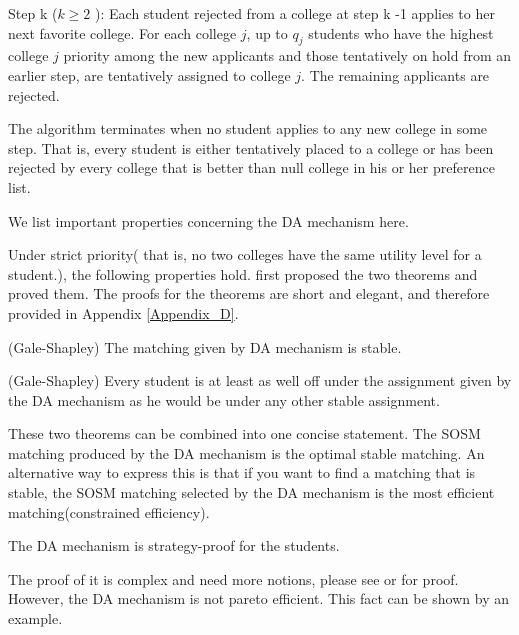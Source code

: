 Step k ($ k \geq 2$ ): Each student rejected from a college at step k -1 applies to her next favorite college.
For each college $j$, up to $q_j$  students who have the highest college
$j$ priority among the new applicants and those tentatively on hold from an earlier step, are
tentatively assigned to college $j$. 
The remaining applicants are rejected.

The algorithm terminates when no student applies to any new college in
some step. That is, every  student is either tentatively placed to a college
or has been rejected by every college that is better than null college
in his or her preference list. 

We list important properties concerning the DA mechanism here.

Under strict priority( that is, no two colleges have  the same utility
level for a student.), the following properties
hold. \parencite{Gale1962} first proposed the two theorems and proved
them. The proofs for the theorems are short and elegant, and therefore
provided in Appendix \ref{Appendix_D}.

\begin{thm*}(Gale-Shapley)
The matching given by DA mechanism is stable.
\end{thm*}

\begin{thm*}(Gale-Shapley)
Every student is at least as well off under the assignment given by
the DA mechanism as he would be under any other stable assignment.
\end{thm*}

These two theorems can be combined into one concise statement. The SOSM
matching produced by the DA mechanism is the optimal stable matching.
An alternative way to express this is that if you want to find a
matching that is stable, the SOSM matching selected by the DA  mechanism is the most
efficient matching(constrained efficiency).

\begin{thm*}
\label{thm1}
The DA mechanism is strategy-proof for the students.
\end{thm*}

The proof of it is complex and need more notions, please see \parencite{Roth1982a} or \parencite{Roth1990}for proof.
However, the DA mechanism is not pareto efficient.  This fact can be shown by an example.


